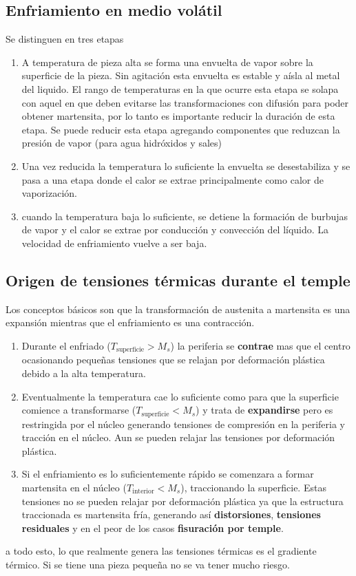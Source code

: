 \documentclass{article}
\begin{document}
\subsection{Enfriamiento en medio volátil}\label{ssec:enfriamientoEnMedio}
Se distinguen en tres etapas
\begin{enumerate}[label=(\Alph*)] \label{enum:etapasTemple}
    \item A temperatura de pieza alta se forma una envuelta de vapor sobre la superficie de la pieza. Sin agitación esta envuelta es estable y aísla al metal del liquido. El rango de temperaturas en la que ocurre esta etapa se solapa con aquel en que deben evitarse las transformaciones con difusión para poder obtener martensita, por lo tanto es importante reducir la duración de esta etapa. Se puede reducir esta etapa agregando componentes que reduzcan la presión de vapor (para agua hidróxidos y sales)\label{item:etapaAEnfriamiento}
    \item Una vez reducida la temperatura lo suficiente la envuelta se desestabiliza y se pasa a una etapa donde el calor se extrae principalmente como calor de vaporización. \label{item:etapaBEnfriamiento}
    \item cuando la temperatura baja lo suficiente, se detiene la formación de burbujas de vapor y el calor se extrae por conducción y convección del líquido. La velocidad de enfriamiento vuelve a ser baja. \label{item:etapaCEnfriamiento}
\end{enumerate}



\subsection{Origen de tensiones térmicas durante el temple}
Los conceptos básicos son que la transformación de austenita a martensita es una expansión mientras que el enfriamiento es una contracción. 
\begin{enumerate}
    \item Durante el enfriado ($T_{\mathrm{superficie}}>M_s$) la periferia se \textbf{contrae} mas que el centro ocasionando pequeñas tensiones que se relajan por deformación plástica debido a la alta temperatura. 
    \item Eventualmente la temperatura cae lo suficiente como para que la superficie comience a transformarse ($T_{\mathrm{superficie}}<M_s$) y trata de \textbf{expandirse} pero es restringida por el núcleo generando tensiones de compresión en la periferia y tracción en el núcleo. Aun se pueden relajar las tensiones por deformación plástica.
    \item Si el enfriamiento es lo suficientemente rápido se comenzara a formar martensita en el núcleo ($T_{\mathrm{interior}}<M_s$), traccionando la superficie. Estas tensiones no se pueden relajar por deformación plástica ya que la estructura traccionada es martensita fría, generando así \textbf{distorsiones}, \textbf{tensiones residuales} y en el peor de los casos \textbf{fisuración por temple}.
\end{enumerate}
a todo esto, lo que realmente genera las tensiones térmicas es el gradiente térmico. Si se tiene una pieza pequeña no se va tener mucho riesgo.
\end{document}
